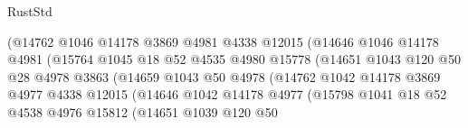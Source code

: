 \begin{lexlean}{RustStd}
\begin{coremodule}
                                    (@14762
                                      @1046
                                      @14178
                                      @3869
                                      @4981
                                      @4338
                                      @12015
                                      (@14646
                                        @1046
                                        @14178
                                        @4981
                                        (@15764
                                          @1045
                                          @18
                                          @52
                                          @4535
                                          @4980
                                          @15778
                                          (@14651
                                            @1043
                                            @120
                                            @50
                                            @28
                                            @4978
                                            @3863
                                            (@14659
                                              @1043
                                              @50
                                              @4978
                                              (@14762
                                                @1042
                                                @14178
                                                @3869
                                                @4977
                                                @4338
                                                @12015
                                                (@14646
                                                  @1042
                                                  @14178
                                                  @4977
                                                  (@15798
                                                    @1041
                                                    @18
                                                    @52
                                                    @4538
                                                    @4976
                                                    @15812
                                                    (@14651
                                                      @1039
                                                      @120
                                                      @50

\end{coremodule}
\end{lexlean}
